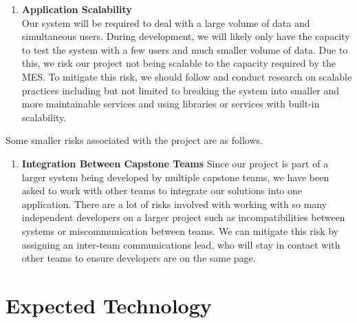 \documentclass{article}
\begin{document}
\begin{flushleft}
\begin{enumerate}
  \item \textbf{Application Scalability} \\
  Our system will be required to deal with a large volume of data and simultaneous users. During development, we will likely only have the capacity to test the system with a few users and much smaller volume of data. Due to this, we risk our project not being scalable to the capacity required by the MES.
  \newline
  \newline
  To mitigate this risk, we should follow and conduct research on scalable practices including but not limited to breaking the system into smaller and more maintainable services and using libraries or services with built-in scalability.
\end{enumerate}

Some smaller risks associated with the project are as follows.

\begin{enumerate}
  \item \textbf{Integration Between Capstone Teams}
  Since our project is part of a larger system being developed by multiple capstone teams, we have been asked to work with other teams to integrate our solutions into one application. There are a lot of risks involved with working with so many independent developers on a larger project such as incompatibilities between systems or miscommunication between teams.
  \newline
  \newline
  We can mitigate this risk by assigning an inter-team communications lead, who will stay in contact with other teams to ensure developers are on the same page.

\end{enumerate}

\end{flushleft}

\section{Expected Technology}
\end{document}
